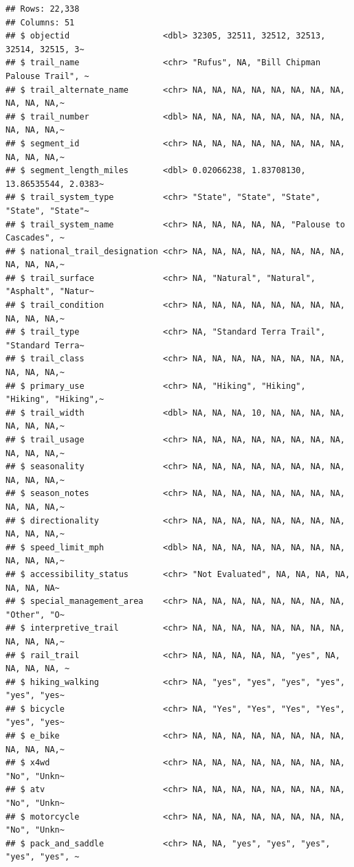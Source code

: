 \documentclass[
]{article}
\begin{document}
\begin{verbatim}
## Rows: 22,338
## Columns: 51
## $ objectid                   <dbl> 32305, 32511, 32512, 32513, 32514, 32515, 3~
## $ trail_name                 <chr> "Rufus", NA, "Bill Chipman Palouse Trail", ~
## $ trail_alternate_name       <chr> NA, NA, NA, NA, NA, NA, NA, NA, NA, NA, NA,~
## $ trail_number               <dbl> NA, NA, NA, NA, NA, NA, NA, NA, NA, NA, NA,~
## $ segment_id                 <chr> NA, NA, NA, NA, NA, NA, NA, NA, NA, NA, NA,~
## $ segment_length_miles       <dbl> 0.02066238, 1.83708130, 13.86535544, 2.0383~
## $ trail_system_type          <chr> "State", "State", "State", "State", "State"~
## $ trail_system_name          <chr> NA, NA, NA, NA, NA, "Palouse to Cascades", ~
## $ national_trail_designation <chr> NA, NA, NA, NA, NA, NA, NA, NA, NA, NA, NA,~
## $ trail_surface              <chr> NA, "Natural", "Natural", "Asphalt", "Natur~
## $ trail_condition            <chr> NA, NA, NA, NA, NA, NA, NA, NA, NA, NA, NA,~
## $ trail_type                 <chr> NA, "Standard Terra Trail", "Standard Terra~
## $ trail_class                <chr> NA, NA, NA, NA, NA, NA, NA, NA, NA, NA, NA,~
## $ primary_use                <chr> NA, "Hiking", "Hiking", "Hiking", "Hiking",~
## $ trail_width                <dbl> NA, NA, NA, 10, NA, NA, NA, NA, NA, NA, NA,~
## $ trail_usage                <chr> NA, NA, NA, NA, NA, NA, NA, NA, NA, NA, NA,~
## $ seasonality                <chr> NA, NA, NA, NA, NA, NA, NA, NA, NA, NA, NA,~
## $ season_notes               <chr> NA, NA, NA, NA, NA, NA, NA, NA, NA, NA, NA,~
## $ directionality             <chr> NA, NA, NA, NA, NA, NA, NA, NA, NA, NA, NA,~
## $ speed_limit_mph            <dbl> NA, NA, NA, NA, NA, NA, NA, NA, NA, NA, NA,~
## $ accessibility_status       <chr> "Not Evaluated", NA, NA, NA, NA, NA, NA, NA~
## $ special_management_area    <chr> NA, NA, NA, NA, NA, NA, NA, NA, "Other", "O~
## $ interpretive_trail         <chr> NA, NA, NA, NA, NA, NA, NA, NA, NA, NA, NA,~
## $ rail_trail                 <chr> NA, NA, NA, NA, NA, "yes", NA, NA, NA, NA, ~
## $ hiking_walking             <chr> NA, "yes", "yes", "yes", "yes", "yes", "yes~
## $ bicycle                    <chr> NA, "Yes", "Yes", "Yes", "Yes", "yes", "yes~
## $ e_bike                     <chr> NA, NA, NA, NA, NA, NA, NA, NA, NA, NA, NA,~
## $ x4wd                       <chr> NA, NA, NA, NA, NA, NA, NA, NA, "No", "Unkn~
## $ atv                        <chr> NA, NA, NA, NA, NA, NA, NA, NA, "No", "Unkn~
## $ motorcycle                 <chr> NA, NA, NA, NA, NA, NA, NA, NA, "No", "Unkn~
## $ pack_and_saddle            <chr> NA, NA, "yes", "yes", "yes", "yes", "yes", ~

\end{verbatim}
\end{document}
